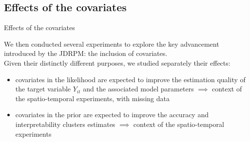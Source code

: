 \documentclass[
	11pt, %
 xcolor={dvipsnames,svgnames}
]{beamer}
\begin{document}
\subsection{Effects of the covariates}
\begin{frame}{Effects of the covariates}

We then conducted several experiments to explore the key advancement introduced by the JDRPM: the inclusion of covariates. \\[6pt]
Given their distinctly different purposes, we studied separately their effects:
\vspace{-5mm}
\begin{itemize}
    \item covariates in the likelihood are expected to improve the estimation quality of the target variable $Y_{it}$ and the associated model parameters $\implies$ context of the spatio-temporal experiments, with missing data
    \item covariates in the prior are expected to improve the accuracy and interpretability clusters estimates $\implies$ context of the spatio-temporal experiments
\end{itemize}
\end{frame}


\end{document}
